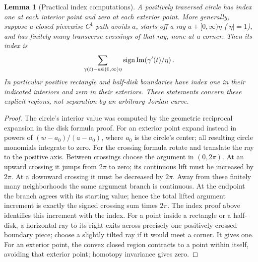\documentclass[11pt,a4paper,openany]{book}
\newtheorem{lemma}[theorem]{Lemma}
\theoremstyle{definition}
\theoremstyle{remark}\newtheorem{remark}[theorem]{Remark}
\begin{document}
\begin{lemma}[Practical index computations]\label{d12:04:crossing-index}
A positively traversed circle has index one at each interior point and
zero at each exterior point. More generally, suppose a closed piecewise
\(C^1\) path avoids \(a\), starts off a ray \(a+[0,\infty)\eta\)
(\(|\eta|=1\)), and has finitely many transverse crossings of that ray,
none at a corner. Then its index is
\[
 \sum_{\gamma(t)-a\in(0,\infty)\eta}
        \operatorname{sign}\operatorname{Im}\!\left(\gamma'(t)/\eta\right).
\]
In particular positive rectangle and half-disk boundaries have index
one in their indicated interiors and zero in their exteriors.
These statements concern these explicit regions, not separation by an
arbitrary Jordan curve.
\end{lemma}
\begin{proof}
The circle's interior value was computed by the geometric reciprocal
expansion in the disk formula proof. For an exterior point expand instead
in powers of \((w-a_0)/(a-a_0)\), where \(a_0\) is the circle's center;
all resulting circle monomials integrate to zero.
For the crossing formula rotate and translate the ray to the positive
axis. Between crossings choose the argument in \((0,2\pi)\).
At an upward crossing it jumps from \(2\pi\) to zero; its continuous
lift must be increased by \(2\pi\). At a downward crossing it must be
decreased by \(2\pi\). Away from these finitely many neighborhoods the
same argument branch is continuous. At the endpoint the branch agrees
with its starting value; hence the total lifted argument increment is
exactly the signed crossing sum times \(2\pi\).
The index proof above identifies this increment with the index.
For a point inside a rectangle or a half-disk, a horizontal ray to its
right exits across precisely one positively crossed boundary piece;
choose a slightly tilted ray if it would meet a corner. It gives one.
For an exterior point, the convex closed region contracts to a point
within itself, avoiding that exterior point; homotopy invariance gives
zero.
\end{proof}
\end{document}
